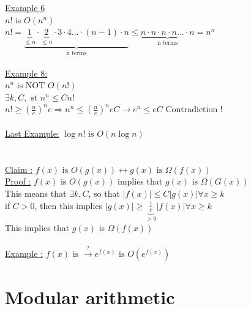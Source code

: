 \documentclass[12pt,a4paper]{article}
\begin{document}
\underline{Example 6}\\
$n!$ is $O(n^n)$\\
$n! = \underbrace{\underbrace{1}_{\leq n}\cdot \underbrace{2}_{\leq n}\cdot 3\cdot 4...\cdot (n-1)\cdot n}_\text{n terms} \leq \underbrace{n\cdot n\cdot n\cdot n...\cdot n}_\text{n terms} = n^n$\\
\\
\underline{Example 8:}\\
$n^n \text{ is NOT } O(n!)$\\
$\exists k, C, \text{ st } n^n \leq C n!$\\
$n! \geq (\frac{n}{e})^ne \Rightarrow n^n \leq (\frac{n}{e})^neC \rightarrow e^n \leq eC \text{ Contradiction !}$\\
\\
\underline{Last Example:}
$\log n! \text{ is } O(n \log n)$\\
\\
\\
\underline{Claim :} $f(x) \text{ is } O(g(x)) \leftrightarrow g(x) \text{ is } \Omega(f(x))$\\
\underline{Proof :} $f(x) \text{ is } O(g(x))$ implies that $g(x) \text{ is } \Omega(G(x))$\\
This means that $\exists k, C$, so that $|f(x)| \leq C|g(x)| \forall x \geq k$\\
if $C > 0$, then this implies $|g(x)| \geq \underbrace{\frac{1}{c}}_{> 0} |f(x)| \forall x \geq k$\\
This implies that $g(x)$ is $\Omega(f(x))$\\
\\
\underline{Example :} $f(x) \text{ is } \overset{?}{\rightarrow} e^{f(x)} \text{ is } O(e^{f(x)})$

\section{Modular arithmetic}
\begin{center}
\end{center}
\end{document}
